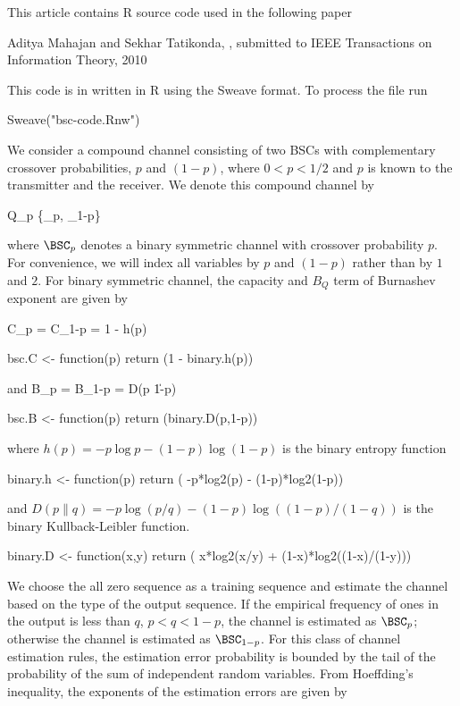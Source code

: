 This article contains R source code used in the following paper

\startframedtext
  Aditya Mahajan and Sekhar Tatikonda, , 
  submitted to IEEE Transactions on Information Theory, 2010
\stopframedtext

This code is in written in R using the Sweave format. To process
the file run

\starttyping
Sweave("bsc-code.Rnw")
\stoptyping

We consider a compound channel consisting of two BSCs with
complementary crossover probabilities, $p$ and $(1-p)$, where
$0 < p < 1/2$ and $p$ is known to the transmitter and the receiver.
We denote this compound channel by

\startformula \ALPHABET Q_p \DEFINED \{\BSC_p, \BSC_{1-p}\}  \stopformula

where $\BSC_p$ denotes a binary symmetric channel with crossover
probability $p$. For convenience, we will index all variables by
$p$ and $(1-p)$ rather than by $1$ and $2$. For binary symmetric
channel, the capacity and $B_Q$ term of Burnashev exponent are
given by

\startformula C_p = C_{1-p} = 1 - h(p) \stopformula

\starttyping
bsc.C <- function(p) 
{
  return (1 - binary.h(p)) 
}
\stoptyping

and \startformula B_p = B_{1-p} = D(p \| 1-p)  \stopformula

\starttyping
bsc.B <- function(p) 
{
  return (binary.D(p,1-p))
}
\stoptyping

where $h(p) = -p \log p - (1-p) \log (1-p)$ is the binary entropy
function

\starttyping
binary.h <- function(p)
{
  return ( -p*log2(p) - (1-p)*log2(1-p))
}
\stoptyping

and $D(p\|q) = -p \log (p/q) - (1-p) \log ( (1-p)/(1-q))$ is the
binary Kullback-Leibler function.

\starttyping
binary.D <- function(x,y)
{
  return ( x*log2(x/y) + (1-x)*log2((1-x)/(1-y)))
}
\stoptyping

We choose the all zero sequence as a training sequence and estimate
the channel based on the type of the output sequence. If the
empirical frequency of ones in the output is less than $q$,
$p < q < 1-p$, the channel is estimated as $\BSC_p$; otherwise the
channel is estimated as $\BSC_{1-p}$. For this class of channel
estimation rules, the estimation error probability is bounded by
the tail of the probability of the sum of independent random
variables. From Hoeffding's inequality, the exponents of the
estimation errors are given by

